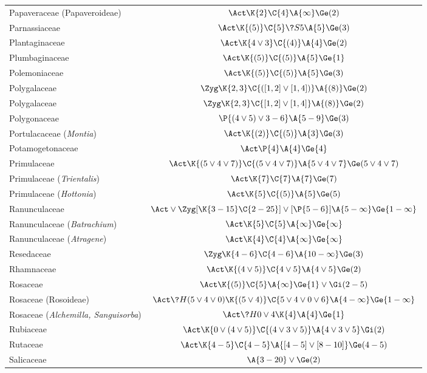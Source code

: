 ﻿\documentclass[12pt]{article}
\begin{document}
\begin{longtable}{lc}
Papaveraceae (Papaveroideae) & $\Act\K{2}\C{4}\A{\infty}\Ge(2)$\\[2pt]
Parnassiaceae & $\Act\K{(5)}\C{5}\?{S}{5}\A{5}\Ge(3)$\\[2pt]
Plantaginaceae  & $\Act\K{4\vee3}\C{(4)}\A{4}\Ge(2)$\\[2pt]
Plumbaginaceae & $\Act\K{(5)}\C{(5)}\A{5}\Ge{1}$\\[2pt]
Polemoniaceae & $\Act\K{(5)}\C{(5)}\A{5}\Ge(3)$\\[2pt]
Polygalaceae & $\Zyg\K{2,3}\C{([1,2]\vee[1,4])}\A{(8)}\Ge(2)$\\[2pt]
Polygalaceae & $\Zyg\K{2,3}\C{[1,2]\vee[1,4]}\A{(8)}\Ge(2)$\\[2pt]
Polygonaceae & $\P{(4\vee5)\vee3-6}\A{5-9}\Ge(3)$\\[2pt]
Portulacaceae (\textit{Montia}) & $\Act\K{(2)}\C{(5)}\A{3}\Ge(3)$\\[2pt]
Potamogetonaceae & $\Act\P{4}\A{4}\Ge{4}$\\[2pt]
Primulaceae & $\Act\K{(5\vee4\vee7)}\C{(5\vee4\vee7)}\A{5\vee4\vee7}\Ge(5\vee4\vee7)$\\[2pt]
Primulaceae (\textit{Trientalis}) & $\Act\K{7}\C{7}\A{7}\Ge(7)$\\[2pt]
Primulaceae (\textit{Hottonia}) & $\Act\K{5}\C{(5)}\A{5}\Ge(5)$\\[2pt]
Ranunculaceae & $\Act\vee\Zyg [\K{3-15}\C{2-25}]\vee[\P{5-6}]\A{5-\infty}\Ge{1-\infty}$\\[2pt]
Ranunculaceae (\textit{Batrachium}) & $\Act\K{5}\C{5}\A{\infty}\Ge{\infty}$\\[2pt]
Ranunculaceae (\textit{Atragene}) & $\Act\K{4}\C{4}\A{\infty}\Ge{\infty}$\\[2pt]
Resedaceae & $\Zyg\K{4-6}\C{4-6}\A{10-\infty}\Ge(3)$\\[2pt]
Rhamnaceae & $\Act\K{(4\vee5)}\C{4\vee5}\A{4\vee5}\Ge(2)$\\[2pt]
Rosaceae & $\Act\K{(5)}\C{5}\A{\infty}\Ge{1}\vee\Gi(2-5)$\\[2pt]
Rosaceae (Rosoideae) & $\Act\?{H}{(5\vee4\vee0)}\K{(5\vee4)}\C{5\vee4\vee0\vee6}\A{4-\infty}\Ge{1-\infty}$\\[2pt]
Rosaceae (\textit{Alchemilla, Sanguisorba}) & $\Act\?{H}{0\vee4}\K{4}\A{4}\Ge{1}$\\[2pt]
Rubiaceae & $\Act\K{0\vee(4\vee5)}\C{(4\vee3\vee5)}\A{4\vee3\vee5}\Gi(2)$\\[2pt]
Rutaceae & $\Act\K{4-5}\C{4-5}\A{[4-5]\vee[8-10]}\Ge(4-5)$\\[2pt]
Salicaceae & $\A{3-20}\vee\Ge(2)$\\[2pt]

\end{longtable}
\end{document}
